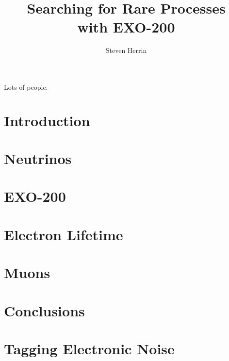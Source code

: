 \documentclass[12pt,twoside]{report}
\begin{document}
\title{Searching for Rare Processes\\
         with EXO-200}
\author{Steven Herrin}
 
\beforepreface



Lots of people.

\afterpreface
 
\chapter{Introduction}


\chapter{Neutrinos}
\label{ch:neutrinos}


\chapter{EXO-200}
\label{ch:detector}

\chapter{Electron Lifetime}
\label{ch:electronlifetime}


\chapter{Muons}
\label{ch:muons}


\chapter{Conclusions}


\appendix
\chapter{Tagging Electronic Noise}
\label{app:noisetagger}






\onlinesignature
\end{document}
